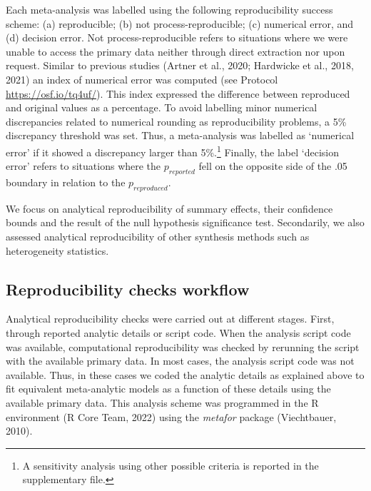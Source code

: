 \documentclass[
  ,apa7,floatsintext]{apa6}
\begin{document}
Each meta-analysis was labelled using the following reproducibility success scheme: (a) reproducible; (b) not process-reproducible; (c) numerical error, and (d) decision error. Not process-reproducible refers to situations where we were unable to access the primary data neither through direct extraction nor upon request. Similar to previous studies (Artner et al., 2020; Hardwicke et al., 2018, 2021) an index of numerical error was computed (see Protocol \url{https://osf.io/tq4uf/}). This index expressed the difference between reproduced and original values as a percentage. To avoid labelling minor numerical discrepancies related to numerical rounding as reproducibility problems, a 5\% discrepancy threshold was set. Thus, a meta-analysis was labelled as `numerical error' if it showed a discrepancy larger than 5\%.\footnote{A sensitivity analysis using other possible criteria is reported in the supplementary file.}
Finally, the label `decision error' refers to situations where the \(p_{reported}\) fell on the opposite side of the .05 boundary in relation to the \(p_{reproduced}\).

We focus on analytical reproducibility of summary effects, their confidence bounds and the result of the null hypothesis significance test. Secondarily, we also assessed analytical reproducibility of other synthesis methods such as heterogeneity statistics.

\hypertarget{reproducibility-checks-workflow}{%
\subsection{Reproducibility checks workflow}\label{reproducibility-checks-workflow}}

Analytical reproducibility checks were carried out at different stages. First, through reported analytic details or script code. When the analysis script code was available, computational reproducibility was checked by rerunning the script with the available primary data. In most cases, the analysis script code was not available. Thus, in these cases we coded the analytic details as explained above to fit equivalent meta-analytic models as a function of these details using the available primary data. This analysis scheme was programmed in the R environment (R Core Team, 2022) using the \emph{metafor} package (Viechtbauer, 2010).
\end{document}
